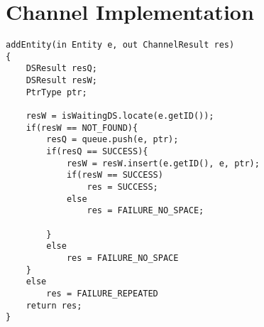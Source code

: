 \documentclass{article}
\begin{document}
\newpage

\section*{Channel Implementation}
\begin{algorithm}
\begin{Verbatim}[tabsize = 4]
addEntity(in Entity e, out ChannelResult res)
{
	DSResult resQ;
	DSResult resW; 
	PtrType ptr; 

	resW = isWaitingDS.locate(e.getID()); 
	if(resW == NOT_FOUND){
		resQ = queue.push(e, ptr); 
		if(resQ == SUCCESS){
			resW = resW.insert(e.getID(), e, ptr); 
			if(resW == SUCCESS)
				res = SUCCESS; 
			else
				res = FAILURE_NO_SPACE; 

		}
		else
			res = FAILURE_NO_SPACE 
	}	
	else
		res = FAILURE_REPEATED 
	return res; 
} 

\end{Verbatim} 
\label{alg:addEntityQueue}
\end{algorithm} 
\end{document}
